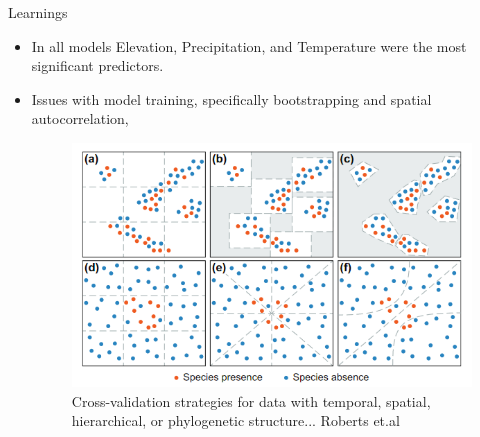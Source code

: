 \documentclass[10pt]{beamer}
\begin{document}
        \begin{frame}{Learnings}
            \begin{itemize}
                \item In all models Elevation, Precipitation, and Temperature were the most significant predictors. 
                \item Issues with model training, specifically bootstrapping and spatial autocorrelation, 
                \begin{figure}
                    \begin{center}
                    \includegraphics[width = .7\textwidth]{ExamplesOfBlockValidation.png}
                    \caption{Cross-validation strategies for data with temporal, spatial, hierarchical, or phylogenetic structure... Roberts et.al}
                \end{center}
                \end{figure}
            \end{itemize}
            
        \end{frame}
\end{document}
